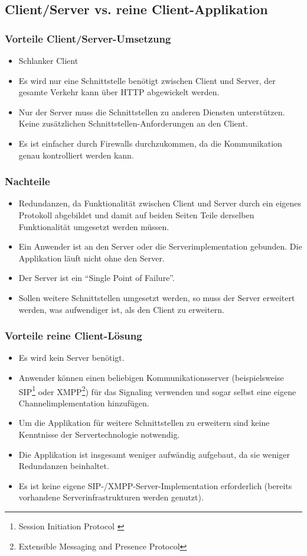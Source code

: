 	\subsection{Client/Server vs. reine Client-Applikation}
		\subsubsection{Vorteile Client/Server-Umsetzung}
		\begin{itemize}
			\item Schlanker Client
			\item Es wird nur eine Schnittstelle benötigt zwischen Client und Server, der gesamte Verkehr kann über HTTP abgewickelt werden.
			\item Nur der Server muss die Schnittstellen zu anderen Diensten
			unterstützen. Keine zusätzlichen Schnittstellen-Anforderungen an den Client.
			\item Es ist einfacher durch Firewalls durchzukommen, da die Kommunikation genau kontrolliert werden kann.
		\end{itemize}
		\subsubsection{Nachteile}
		\begin{itemize}
			\item Redundanzen, da Funktionalität zwischen Client und Server durch
			ein eigenes Protokoll abgebildet und damit auf beiden Seiten Teile derselben
			Funktionalität umgesetzt werden müssen.
			\item Ein Anwender ist an den Server oder die Serverimplementation gebunden.
			Die Applikation läuft nicht ohne den Server.
			\item Der Server ist ein "`Single Point of Failure"'.
			\item Sollen weitere Schnittstellen umgesetzt werden, so muss der Server
			erweitert werden, was aufwendiger ist, als den Client zu erweitern.
		\end{itemize}


		\subsubsection{Vorteile reine Client-Lösung}
		\begin{itemize}
			\item Es wird kein Server benötigt.
			\item Anwender können einen beliebigen Kommunikationsserver
			(beispielsweise SIP\footnote{Session Initiation Protocol \cite{IETF-SDP-RFC}} oder
			XMPP\footnote{Extensible Messaging and Presence Protocol}) für das
			Signaling verwenden und sogar selbst eine eigene Channelimplementation
			hinzufügen.
			\item Um die Applikation für weitere Schnittstellen zu erweitern sind keine
			Kenntnisse der Servertechnologie notwendig.
			\item Die Applikation ist insgesamt weniger aufwändig aufgebaut, da sie
			weniger Redundanzen beinhaltet.
			\item Es ist keine eigene SIP-/XMPP-Server-Implementation erforderlich
			(bereits vorhandene Serverinfrastrukturen werden genutzt).
		\end{itemize}
